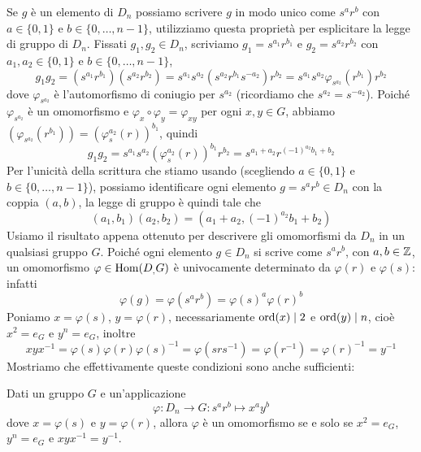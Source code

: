 \documentclass[11pt]{scrartcl}
\begin{document}
Se $g$ è un elemento di $D_n$ possiamo scrivere $g$ in modo unico come $s^ar^b$ 
con $a \in \{0, 1\}$ e $b \in \{0, \ldots, n - 1\}$, utilizziamo questa 
proprietà per esplicitare la legge di gruppo di $D_n$. \newline
Fissati $g_1, g_2 \in D_n$, scriviamo $g_1 = s^{a_1}r^{b_1}$ e $g_2 = s^{a_2}r^{b_2}$
con $a_1, a_2 \in \{0, 1\}$ e $b \in \{0, \ldots, n - 1\}$, 
\[
    g_1g_2 = (s^{a_1}r^{b_1})(s^{a_2}r^{b_2}) = s^{a_1}s^{a_2}(s^{a_2}r^{b_1}s^{-a_2})r^{b_2} = 
    s^{a_1}s^{a_2}\varphi_{s^{a_2}}(r^{b_1})r^{b_2}
\]
dove $\varphi_{s^{a_2}}$ è l'automorfismo di coniugio per $s^{a_2}$
(ricordiamo che $s^{a_2} = s^{-a_2}$). Poiché
$\varphi_{s^{a_2}}$ è un omomorfismo e $\varphi_x\circ\varphi_y = \varphi_{xy}$ per ogni $x, y \in G$,
abbiamo $(\varphi_{s^{a_2}}(r^{b_1})) = (\varphi_s^{a_2}(r))^{b_1}$, quindi
\[
    g_1g_2 = s^{a_1}s^{a_2}(\varphi_s^{a_2}(r))^{b_1}r^{b_2} = 
    s^{a_1 + a_2}r^{(-1)^{a_2}b_1 + b_2}
\]
Per l'unicità della scrittura che stiamo usando (scegliendo 
$a \in \{0, 1\}$ e $b \in \{0, \ldots, n - 1\}$), possiamo identificare 
ogni elemento $g = s^ar^b \in D_n$ con la coppia $(a, b)$, la legge di gruppo
è quindi tale che \[
    (a_1, b_1)(a_2, b_2) = (a_1 + a_2, (-1)^{a_2}b_1 + b_2)
\]
\newline 
Usiamo il risultato appena ottenuto per descrivere gli omomorfismi da $D_n$ in 
un qualsiasi gruppo $G$. Poiché ogni elemento $g \in D_n$ si scrive come
$s^ar^b$, con $a, b \in \mathbb Z$, un omomorfismo $\varphi \in \operatorname{Hom}(D_, G)$ è univocamente
determinato da $\varphi(r)$ e $\varphi(s)$: infatti \[
    \varphi(g) = \varphi(s^ar^b) = \varphi(s)^a\varphi(r)^b
\]Poniamo $x = \varphi(s)$, $y = \varphi(r)$, necessariamente $\operatorname{ord}(x) \mid 2$
e $\operatorname{ord}(y)\mid n$, cioè $x^2 = e_G$ e $y^n = e_G$, inoltre \[
    xyx^{-1} = \varphi(s)\varphi(r)\varphi(s)^{-1} = \varphi(srs^{-1}) = 
    \varphi(r^{-1}) = \varphi(r)^{-1} = y^{-1}
\]Mostriamo che effettivamente queste condizioni sono anche sufficienti:

\begin{proposition}
    Dati un gruppo $G$ e un'applicazione
    \[
        \varphi:D_n\longrightarrow G :s^ar^b \longmapsto x^ay^b
    \]dove $x = \varphi(s)$ e $y = \varphi(r)$, allora $\varphi$ è un omomorfismo
    se e solo se $x^2 = e_G$, $y^n = e_G$ e $xyx^{-1} = y^{-1}$.
\end{proposition}
\end{document}
